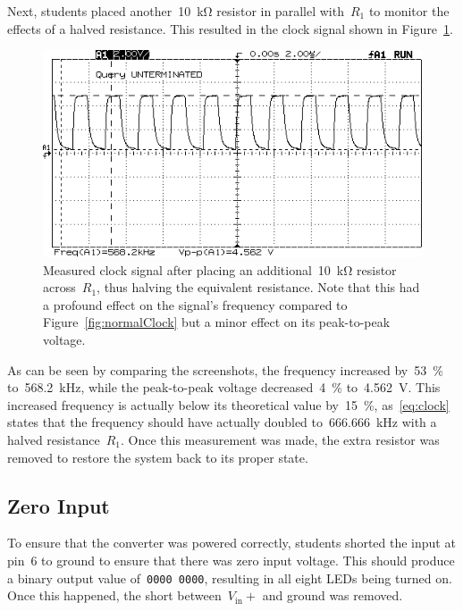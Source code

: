 %
Next, students placed another~\SI{10}{\kilo\ohm} resistor in parallel with~$R_1$ to monitor the effects of a halved resistance.  This resulted in the clock signal shown in Figure~\ref{fig:fastClock}.
%
\begin{figure}[H]
	\centering
	\includegraphics[width=.6\textwidth]{img/shot/part2bshot.png}
	\parbox{.6\textwidth}{
	\caption[Atypical ADC clock signal]{Measured clock signal after placing an additional~\SI{10}{\kilo\ohm} resistor across~$R_1$, thus halving the equivalent resistance.  Note that this had a profound effect on the signal's frequency compared to Figure~\ref{fig:normalClock} but a minor effect on its peak-to-peak voltage.}
	\label{fig:fastClock}}
\end{figure}
%
As can be seen by comparing the screenshots, the frequency increased by~\SI{53}{\percent} to~\SI{568.2}{\kilo\hertz}, while the peak-to-peak voltage decreased~\SI{4}{\percent} to~\SI{4.562}{\volt}.  This increased frequency is actually below its theoretical value by~\SI{15}{\percent}, as~\eqref{eq:clock} states that the frequency should have actually doubled to~\SI{666.666}{\kilo\hertz} with a halved resistance~$R_1$.  Once this measurement was made, the extra resistor was removed to restore the system back to its proper state.

\subsection{Zero Input}
To ensure that the converter was powered correctly, students shorted the input at pin~6 to ground to ensure that there was zero input voltage.  This should produce a binary output value of~\texttt{0000~0000}, resulting in all eight LEDs being turned on.  Once this happened, the short between~$V_\text{in}+$ and ground was removed.

